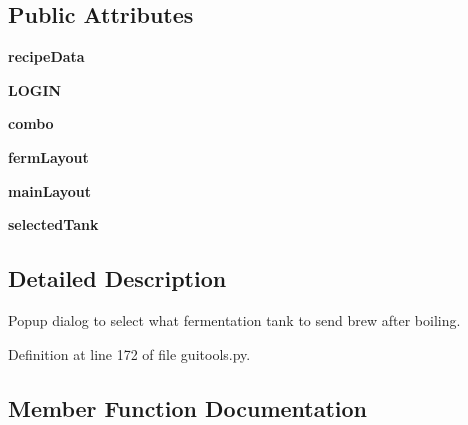 \subsection*{Public Attributes}
\begin{DoxyCompactItemize}
\item 
\mbox{\label{classguitools_1_1_boil_finished_popup_a1525c68bc37363c07ab3d23a83ef5d2e}} 
{\bfseries recipe\+Data}
\item 
\mbox{\label{classguitools_1_1_boil_finished_popup_af9161da199e10ef4b3bf04765107e074}} 
{\bfseries L\+O\+G\+IN}
\item 
\mbox{\label{classguitools_1_1_boil_finished_popup_a5cd4dc48788c393e9ad07e376006bf52}} 
{\bfseries combo}
\item 
\mbox{\label{classguitools_1_1_boil_finished_popup_a8372cd48c5633a6db2e50f537e55942b}} 
{\bfseries ferm\+Layout}
\item 
\mbox{\label{classguitools_1_1_boil_finished_popup_af1cd05fb9d629cd79666dc00c0b6a077}} 
{\bfseries main\+Layout}
\item 
\mbox{\label{classguitools_1_1_boil_finished_popup_aececff9540c4d6a9584c570ef4a709cd}} 
{\bfseries selected\+Tank}
\end{DoxyCompactItemize}


\subsection{Detailed Description}
Popup dialog to select what fermentation tank to send brew after boiling. 



Definition at line 172 of file guitools.\+py.



\subsection{Member Function Documentation}
\mbox{\label{classguitools_1_1_boil_finished_popup_a49b7a64add2e7f150c452cccfb7c8341}} 
